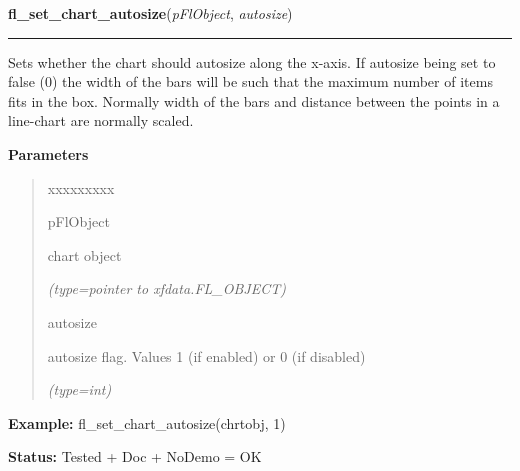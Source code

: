     \vspace{0.5ex}

\hspace{.8\funcindent}\begin{boxedminipage}{\funcwidth}

    \raggedright \textbf{fl\_set\_chart\_autosize}(\textit{pFlObject}, \textit{autosize})

    \vspace{-1.5ex}

    \rule{\textwidth}{0.5\fboxrule}
\setlength{\parskip}{2ex}
    Sets whether the chart should autosize along the x-axis. If autosize 
    being set to false (0) the width of the bars will be such that the 
    maximum number of items fits in the box. Normally width of the bars and
    distance between the points in a line-chart are normally scaled.

\setlength{\parskip}{1ex}
      \textbf{Parameters}
      \vspace{-1ex}

      \begin{quote}
        \begin{Ventry}{xxxxxxxxx}

          \item[pFlObject]

          chart object

            {\it (type=pointer to xfdata.FL\_OBJECT)}

          \item[autosize]

          autosize flag. Values 1 (if enabled) or 0 (if disabled)

            {\it (type=int)}

        \end{Ventry}

      \end{quote}

\textbf{Example:} fl\_set\_chart\_autosize(chrtobj, 1)



\textbf{Status:} Tested + Doc + NoDemo = OK



    \end{boxedminipage}

    \label{xformslib:flchart:fl_set_chart_lstyle}

    \vspace{0.5ex}

